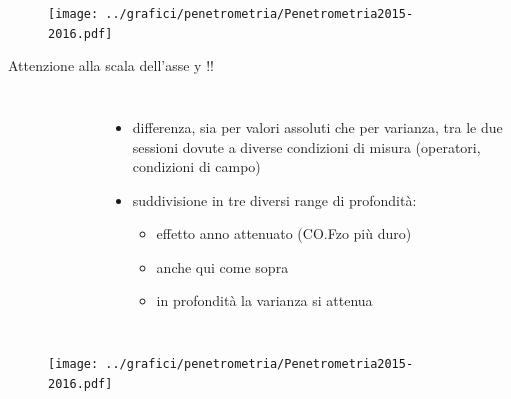 \begin{frame}
  \begin{figure}[ht]
    \texttt{[image: ../grafici/penetrometria/Penetrometria2015-2016.pdf]}
  \end{figure}
\end{frame}

\begin{frame}{Attenzione alla scala dell'asse y !!}
  \begin{columns}
    \begin{figure}
    \end{figure}
    
    \begin{itemize}[<+->]
      \small    
    \item differenza, sia per valori assoluti che per varianza, tra le
      due sessioni dovute a diverse condizioni di misura (operatori,
      condizioni di campo)
    \item suddivisione in tre diversi range di profondit\`a:
      \begin{itemize}
      \item effetto anno attenuato (CO.Fzo pi\`u duro) %
      \item anche qui come sopra       %
      \item in profondit\`a la varianza si
        attenua %
      \end{itemize}
    \end{itemize}
  \end{columns}
\end{frame}

\begin{frame}
  \begin{figure}[ht]
    \texttt{[image: ../grafici/penetrometria/Penetrometria2015-2016.pdf]}
  \end{figure}
\end{frame}


